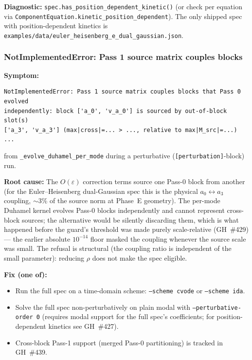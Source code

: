 \textbf{Diagnostic:} \texttt{spec.has\_position\_dependent\_kinetic()} (or check
per equation via \texttt{ComponentEquation.kinetic\_position\_dependent}).  The
only shipped spec with position-dependent kinetics is
\texttt{examples/data/euler\_heisenberg\_e\_dual\_gaussian.json}.

\subsubsection{NotImplementedError: Pass 1 source matrix couples blocks}
\label{sec:troubleshooting-pass1-cross-block}

\textbf{Symptom:}
\begin{lstlisting}[style=python]
NotImplementedError: Pass 1 source matrix couples blocks that Pass 0 evolved
independently: block ['a_0', 'v_a_0'] is sourced by out-of-block slot(s)
['a_3', 'v_a_3'] (max|cross|=... > ..., relative to max|M_src|=...) ...
\end{lstlisting}
from \texttt{\_evolve\_duhamel\_per\_mode} during a perturbative
(\texttt{[perturbation]}-block) run.

\textbf{Root cause:} The $O(\varepsilon)$ correction terms source one Pass-0
block from another (for the Euler--Heisenberg dual-Gaussian spec this is the
physical $a_0 \leftrightarrow a_3$ coupling, $\sim$3\% of the source norm at
Phase~E geometry).  The per-mode Duhamel kernel evolves Pass-0 blocks
independently and cannot represent cross-block sources; the alternative would
be silently discarding them, which is what happened before the guard's
threshold was made purely scale-relative (GH~\#429) --- the earlier absolute
$10^{-14}$ floor masked the coupling whenever the source scale was small.
The refusal is structural (the coupling ratio is independent of the small
parameter): reducing $\rho$ does not make the spec eligible.

\textbf{Fix (one of):}
\begin{itemize}
  \item Run the full spec on a time-domain scheme: \texttt{--scheme cvode} or
    \texttt{--scheme ida}.
  \item Solve the full spec non-perturbatively on plain modal with
    \texttt{--perturbative-order 0} (requires modal support for the full
    spec's coefficients; for position-dependent kinetics see GH~\#427).
  \item Cross-block Pass-1 support (merged Pass-0 partitioning) is tracked in
    GH~\#439.
\end{itemize}


